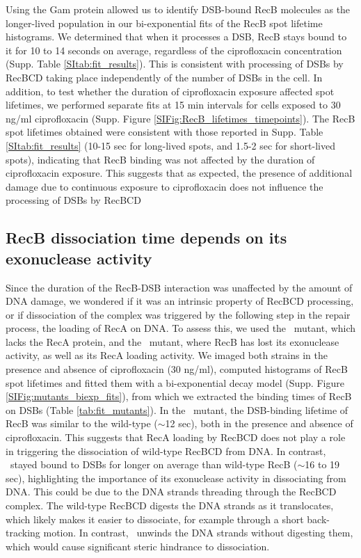 Using the Gam protein allowed us to identify DSB-bound RecB molecules as the longer-lived population in our bi-exponential fits of the RecB spot lifetime histograms. We determined that when it processes a DSB, RecB stays bound to it for 10 to 14 seconds on average, regardless of the ciprofloxacin concentration (Supp. Table \ref{SItab:fit_results}). This is consistent with processing of DSBs by RecBCD taking place independently of the number of DSBs in the cell. In addition, to test whether the duration of ciprofloxacin exposure affected spot lifetimes, we performed separate fits at 15 min intervals for cells exposed to 30 ng/ml ciprofloxacin (Supp. Figure \ref{SIFig:RecB_lifetimes_timepoints}). The RecB spot lifetimes obtained were consistent with those reported in Supp. Table \ref{SItab:fit_results} (10-15 sec for long-lived spots, and 1.5-2 sec for short-lived spots), indicating that RecB binding was not affected by the duration of ciprofloxacin exposure. This suggests that as expected, the presence of additional damage due to continuous exposure to ciprofloxacin does not influence the processing of DSBs by RecBCD

\subsection*{RecB dissociation time depends on its exonuclease activity}
Since the duration of the RecB-DSB interaction was unaffected by the amount of DNA damage, we wondered if it was an intrinsic property of RecBCD processing, or if dissociation of the complex was triggered by the following step in the repair process, the loading of RecA on DNA. To assess this, we used the \dreca\ mutant, which lacks the RecA protein, and the \geneteneighty\ mutant, where RecB has lost its exonuclease activity, as well as its RecA loading activity. We imaged both strains in the presence and absence of ciprofloxacin (30 ng/ml), computed histograms of RecB spot lifetimes and fitted them with a bi-exponential decay model (Supp. Figure \ref{SIFig:mutants_biexp_fits}), from which we extracted the binding times of RecB on DSBs (Table \ref{tab:fit_mutants}). In the \dreca\ mutant, the DSB-binding lifetime of RecB was similar to the wild-type ($\sim$12 sec), both in the presence and absence of ciprofloxacin. This suggests that RecA loading by RecBCD does not play a role in triggering the dissociation of wild-type RecBCD from DNA. In contrast, \teneighty\ stayed bound to DSBs for longer on average than wild-type RecB ($\sim$16 to 19 sec), highlighting the importance of its exonuclease activity in dissociating from DNA. This could be due to the DNA strands threading through the RecBCD complex. The wild-type RecBCD digests the DNA strands as it translocates, which likely makes it easier to dissociate, for example through a short back-tracking motion. In contrast, \teneighty\ unwinds the DNA strands without digesting them, which would cause significant steric hindrance to dissociation.

